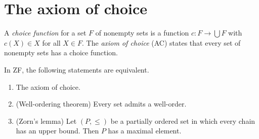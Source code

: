 \section{The axiom of choice}\label{sets:section-choice}

\begin{definition}\label{sets:definition-choice}
A \emph{choice function} for a set $F$ of nonempty sets is a function
$c \colon F \to \bigcup F$ with $c(X) \in X$ for all $X \in F$. The \emph{axiom of
choice} (AC) states that every set of nonempty sets has a choice function.
\end{definition}

\begin{theorem}\label{sets:theorem-choice-equivalents}
In ZF, the following statements are equivalent.
\begin{enumerate}
\item The axiom of choice.
\item (Well-ordering theorem) Every set admits a well-order.
\item (Zorn's lemma) Let $(P, \leq)$ be a partially ordered set in which every
chain has an upper bound. Then $P$ has a maximal element.
\end{enumerate}
\end{theorem}

